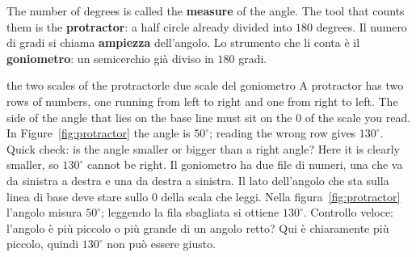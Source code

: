 \begin{bi}
The number of degrees is called the \textbf{measure} of the angle. The tool that counts them is the \textbf{protractor}: a half circle already divided into $180$ degrees.
\IT
Il numero di gradi si chiama \textbf{ampiezza} dell'angolo. Lo strumento che li conta è il \textbf{goniometro}: un semicerchio già diviso in $180$ gradi.
\end{bi}

\begin{trap}{the two scales of the protractor}{le due scale del goniometro}
A protractor has two rows of numbers, one running from left to right and one from right to left. The side of the angle that lies on the base line must sit on the $0$ of the scale you read. In Figure~\ref{fig:protractor} the angle is $50^\circ$; reading the wrong row gives $130^\circ$. Quick check: is the angle smaller or bigger than a right angle? Here it is clearly smaller, so $130^\circ$ cannot be right.
\tcblower
Il goniometro ha due file di numeri, una che va da sinistra a destra e una da destra a sinistra. Il lato dell'angolo che sta sulla linea di base deve stare sullo $0$ della scala che leggi. Nella figura~\ref{fig:protractor} l'angolo misura $50^\circ$; leggendo la fila sbagliata si ottiene $130^\circ$. Controllo veloce: l'angolo è più piccolo o più grande di un angolo retto? Qui è chiaramente più piccolo, quindi $130^\circ$ non può essere giusto.
\end{trap}

